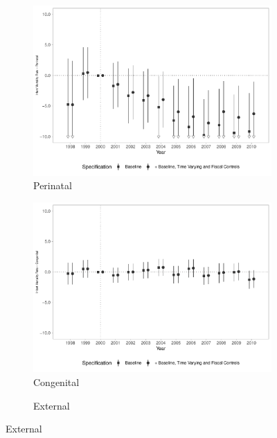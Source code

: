 \begin{figure}[h!]
\begin{center}
    \begin{subfigure}{0.32\textwidth}
        \centering
        \caption{\scriptsize Perinatal}\label{fig:18c}
        \includegraphics[width=\textwidth]{plots/tx_mi_perinat_dist_ec29_baseline_dist_ec29_baseline_18.pdf}
    \end{subfigure}
        \begin{subfigure}{0.32\textwidth}
        \centering
        \caption{\scriptsize Congenital}\label{fig:18d}
        \includegraphics[width=\textwidth]{plots/tx_mi_cong_dist_ec29_baseline_dist_ec29_baseline_18.pdf}
    \end{subfigure}
        \begin{subfigure}{0.32\textwidth}
        \centering
        \caption{\scriptsize External}\label{fig:18e}

\end{subfigure}
\end{center}
\end{figure}
